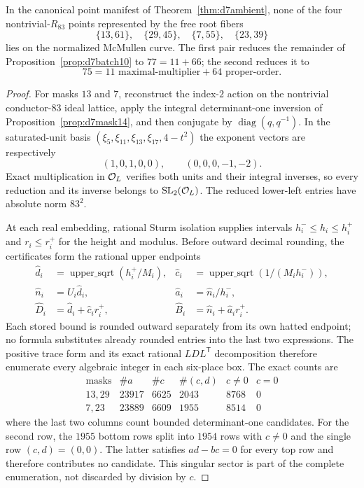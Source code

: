\begin{proposition}[The final two proper-order $d=7$ exclusion pairs]\label{prop:d7finalpairs}
In the canonical point manifest of Theorem~\ref{thm:d7ambient}, none of the
four nontrivial-$R_{83}$ points represented by the free root fibers
\[
 \{13,61\},\quad \{29,45\},\quad \{7,55\},\quad \{23,39\}
\]
lies on the normalized McMullen curve.  The first pair reduces the remainder
of Proposition~\ref{prop:d7batch10} to $77=11+66$; the second reduces it to
\[
 75=11\text{ maximal-multiplier}+64\text{ proper-order}.
\]
\end{proposition}
\begin{proof}
For masks $13$ and $7$, reconstruct the index-$2$ action on the nontrivial
conductor-$83$ ideal lattice, apply the integral determinant-one inversion of
Proposition~\ref{prop:d7mask14}, and then conjugate by
$\operatorname{diag}(q,q^{-1})$.  In the saturated-unit basis
$(\xi_5,\xi_{11},\xi_{13},\xi_{17},4-t^2)$ the exponent vectors are
respectively
\[
 (1,0,1,0,0),\qquad (0,0,0,-1,-2).
\]
Exact multiplication in $\mathcal O_L$ verifies both units and their integral inverses,
so every reduction and its inverse belongs to $\operatorname{SL}_2(\mathcal O_L)$.  The reduced
lower-left entries have absolute norm $83^2$.

At each real embedding, rational Sturm isolation supplies intervals
$h_i^-\leq h_i\leq h_i^+$ and $r_i\leq r_i^+$ for the height and modulus.
Before outward decimal rounding, the certificates form the rational upper
endpoints
\[
\begin{aligned}
 \widehat d_i&=\operatorname{upper\_sqrt}(h_i^+/M_i),&
 \widehat c_i&=\operatorname{upper\_sqrt}(1/(M_i h_i^-)),\\
 \widehat n_i&=U_i\widehat d_i,&
 \widehat a_i&=\widehat n_i/h_i^-,\\
 \widehat D_i&=\widehat d_i+\widehat c_i r_i^+,&
 \widehat B_i&=\widehat n_i+\widehat a_i r_i^+.
\end{aligned}
\]
Each stored bound is rounded outward separately from its own hatted endpoint;
no formula substitutes already rounded entries into the last two expressions.
The positive trace form and its exact rational $LDL^{\mathsf T}$ decomposition
therefore enumerate every algebraic integer in each six-place box.  The exact
counts are
\[
\begin{array}{c|rrrrr}
\text{masks}&\#a&\#c&\#(c,d)&c\ne0&c=0\\ \hline
13,29&23917&6625&2043&8768&0\\
7,23 &23889&6609&1955&8514&0
\end{array}
\]
where the last two columns count bounded determinant-one candidates.  For the
second row, the $1955$ bottom rows split into $1954$ rows with $c\ne0$ and the
single row $(c,d)=(0,0)$.  The latter satisfies $ad-bc=0$ for every top row and
therefore contributes no candidate.  This singular sector is part of the
complete enumeration, not discarded by division by $c$.


\end{proof}
